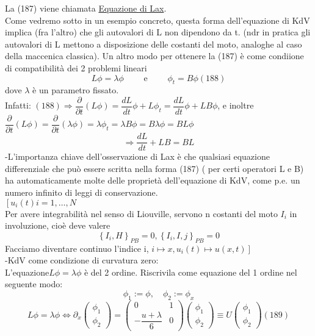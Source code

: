 \documentclass[a4paper,11pt]{report}
\begin{document}
La (187) viene chiamata \underline{Equazione di Lax}.\\
Come vedremo sotto in un esempio concreto, questa forma dell'equazione di KdV implica (fra l'altro) che gli autovalori di L non dipendono da t. (ndr in pratica gli autovalori di L mettono a disposizione delle costanti del moto, analoghe al caso della maccenica classica). Un altro modo per ottenere la (187) è come condiione di compatibilità dei 2 problemi lineari
\begin{equation}
L\phi =\lambda \phi \qquad \text{ e } \qquad \phi_t = B\phi (188)
\end{equation}
dove $\lambda$ è un parametro fissato.\\
Infatti: $(188)\Rightarrow \dfrac{\partial}{\partial t}(L\phi) = \dfrac{dL}{dt}\phi + L\phi_t = \dfrac{dL}{dt}\phi + LB\phi$, e inoltre $\dfrac{\partial}{\partial t}(L\phi) = \dfrac{\partial}{\partial t}(\lambda \phi) = \lambda \phi_t = \lambda B \phi = B\lambda\phi = BL\phi$
$$
\Rightarrow \dfrac{dL}{dt} + LB = BL
$$
-L'importanza chiave dell'osservazione di Lax è che qualsiasi equazione differenziale che può essere scritta nella forma (187) ( per certi operatori L e B) ha automaticamente molte delle proprietà dell'equazione di KdV, come p.e. un numero infinito di leggi di conservazione.\\
$\left[u_i(t) i=1,\dots,N\right.$ \\
Per avere integrabilità nel senso di Liouville, servono n costanti del moto $I_i$ in involuzione, cioè  deve valere 
$$ 
\left\{I_i,H \right\}_{PB}=0, \left\{I_i,I,j\right\}_{PB}=0
$$
Facciamo diventare continuo l'indice i, $i\mapsto x, u_i(t)\mapsto u(x,t) \left.\right]$\\
-KdV come condizione di curvatura zero:\\
L'equazione$L\phi = \lambda \phi $ è del 2 ordine. Riscrivila come equazione del 1 ordine nel seguente modo:
$$
\phi_1:=\phi, \quad \phi_2:=\phi_x
$$
\begin{equation}
L\phi = \lambda \phi \Leftrightarrow \partial_x\left(\begin{matrix}
\phi_1 \\
\phi_2
\end{matrix}\right) = \left(\begin{matrix}
0 & 1 \\
-\dfrac{u+\lambda}{6} & 0
\end{matrix}\right)\left( \begin{matrix}
\phi_1 \\
\phi_2
\end{matrix} \right) \equiv U\left(\begin{matrix}
\phi_1 \\
\phi_2
\end{matrix}\right) (189)
\end{equation}
\end{document}
